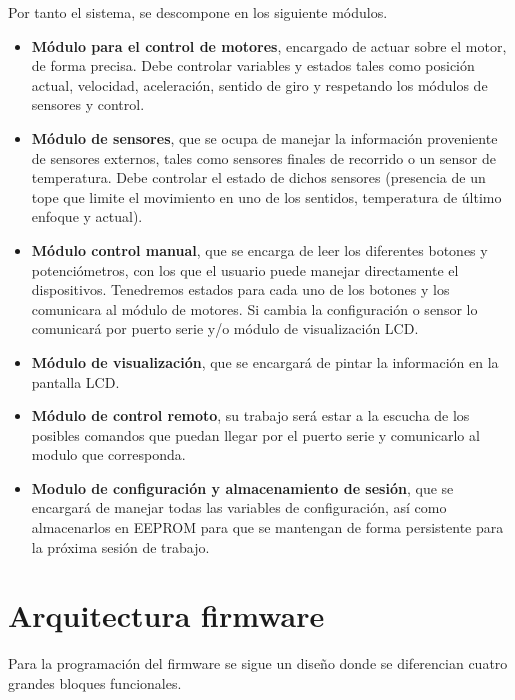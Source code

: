 Por tanto el sistema, se descompone en los siguiente módulos.

\begin{itemize}
	\item \textbf{Módulo para el control de motores}, encargado de actuar sobre el motor, de forma precisa. Debe controlar variables y estados tales como  posición actual, velocidad, aceleración, sentido de giro y respetando los módulos de sensores y control. 
	
	\item \textbf{Módulo de sensores}, que se ocupa de manejar la información proveniente de sensores externos, tales como sensores finales de recorrido o un sensor de temperatura. Debe controlar el estado de dichos sensores (presencia de un tope que limite el movimiento en uno de los sentidos, temperatura de último enfoque y actual).
	
	\item \textbf{Módulo control manual}, que se encarga de leer los diferentes botones y potenciómetros, con los que el usuario puede manejar directamente el dispositivos. Tenedremos estados para cada uno de los botones y los comunicara al módulo de motores. Si cambia la configuración o sensor lo comunicará por puerto serie y/o módulo de visualización LCD.
	
	\item \textbf{Módulo de visualización}, que se encargará de pintar la información en la pantalla LCD.
	
	\item \textbf{Módulo de control remoto}, su trabajo será estar a la escucha de los posibles comandos que puedan llegar por el puerto serie y comunicarlo al modulo que corresponda. 
	
	\item \textbf{Modulo de configuración y almacenamiento de sesión}, que se encargará de manejar todas las variables de configuración, así como almacenarlos en EEPROM para que se mantengan de forma persistente para la próxima sesión de trabajo.
	
\end{itemize}



\section{Arquitectura firmware}


Para la programación del firmware se sigue un diseño donde se diferencian cuatro grandes bloques funcionales. 



